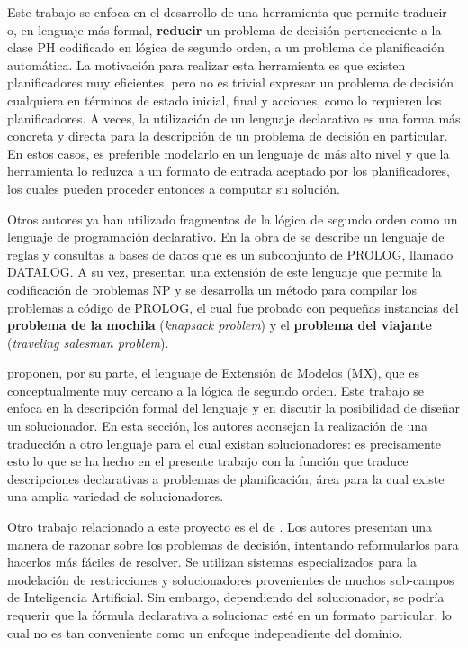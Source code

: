 Este trabajo se enfoca en el desarrollo de una herramienta que permite
traducir o, en lenguaje más formal, \textbf{reducir} un problema de
decisión perteneciente a la clase PH codificado en lógica de segundo orden,
a un problema de planificación automática. 
La motivación para realizar esta herramienta es que
existen planificadores muy eficientes, pero no es trivial
expresar un problema de decisión cualquiera en términos de estado inicial,
final y acciones, como lo requieren los
planificadores. A veces, la utilización de un lenguaje declarativo es una forma
más concreta y directa para la descripción de un problema de decisión en
particular. En estos casos, es preferible modelarlo en un lenguaje de más alto
nivel y que la herramienta lo reduzca a un formato de entrada aceptado por
los planificadores, los cuales pueden proceder entonces a computar su solución.

Otros autores ya han utilizado fragmentos de la lógica de segundo orden como un lenguaje de
programación declarativo. En la obra de \cite{reiter:cwa} se describe un
lenguaje de reglas y consultas a bases de datos que es un subconjunto de
PROLOG, llamado DATALOG. A su vez, \cite{cadoli:npspec} presentan una
extensión de este lenguaje que permite la codificación de problemas NP y
se desarrolla un método para compilar los problemas a código de PROLOG, el cual
fue probado con pequeñas instancias del \textbf{problema de la mochila}
(\textit{knapsack problem}) y el \textbf{problema del viajante}
(\textit{traveling salesman problem}).

\cite{mitchell:npsearch} proponen, por su parte, el lenguaje de
Extensión de Modelos (MX), que es conceptualmente muy cercano a la lógica de
segundo orden. Este trabajo se enfoca en la descripción formal del lenguaje y
en discutir la posibilidad de diseñar un solucionador. En esta sección, los
autores aconsejan la realización de una traducción a otro lenguaje para el cual
existan solucionadores: es precisamente esto lo que se ha hecho en el presente
trabajo con la función que traduce descripciones declarativas a problemas
de planificación, área para la cual existe una amplia variedad de solucionadores.

Otro trabajo relacionado a este proyecto es el de \cite{cadoli:safedelay}. Los
autores presentan una manera de razonar sobre los problemas de
decisión, intentando reformularlos para hacerlos más fáciles de resolver. Se
utilizan sistemas especializados para la modelación de restricciones y
solucionadores provenientes de muchos sub-campos de Inteligencia Artificial.
Sin embargo, dependiendo del solucionador, se podría requerir que la fórmula
declarativa a solucionar esté en un formato particular, lo cual no es tan
conveniente como un enfoque independiente del dominio.

